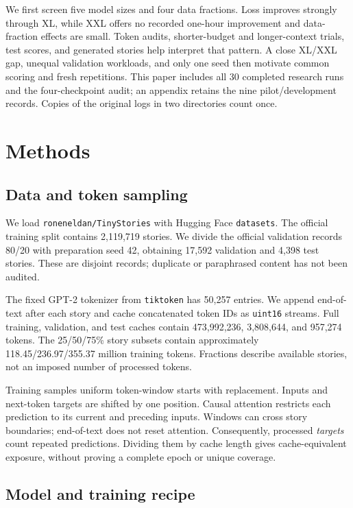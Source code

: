 \documentclass[10pt,twocolumn,letterpaper]{article}
\begin{document}
We first screen five model sizes and four data fractions. Loss improves strongly
through XL, while XXL offers no recorded one-hour improvement and data-fraction
effects are small. Token audits, shorter-budget and longer-context trials, test
scores, and generated stories help interpret that pattern. A close XL/XXL gap,
unequal validation workloads, and only one seed then motivate common scoring and
fresh repetitions. This paper includes all 30 completed research runs and the
four-checkpoint audit; an appendix retains the nine pilot/development records.
Copies of the original logs in two directories count once.

\section{Methods}

\subsection{Data and token sampling}

We load \texttt{roneneldan/TinyStories} with Hugging Face \texttt{datasets}.
The official training split contains 2,119,719 stories. We divide the official
validation records 80/20 with preparation seed 42, obtaining 17,592 validation
and 4,398 test stories. These are disjoint records; duplicate or paraphrased
content has not been audited.

The fixed GPT-2 tokenizer from \texttt{tiktoken} has 50,257 entries. We append
end-of-text after each story and cache concatenated token IDs as \texttt{uint16}
streams. Full training, validation, and test caches contain 473,992,236,
3,808,644, and 957,274 tokens. The 25/50/75\% story subsets contain approximately
118.45/236.97/355.37 million training tokens. Fractions describe available
stories, not an imposed number of processed tokens.

Training samples uniform token-window starts with replacement. Inputs and
next-token targets are shifted by one position. Causal attention restricts each
prediction to its current and preceding inputs. Windows can cross story
boundaries; end-of-text does not reset attention. Consequently, processed
\emph{targets} count repeated predictions. Dividing them by cache length gives
cache-equivalent exposure, without proving a complete epoch or unique coverage.

\subsection{Model and training recipe}
\end{document}
